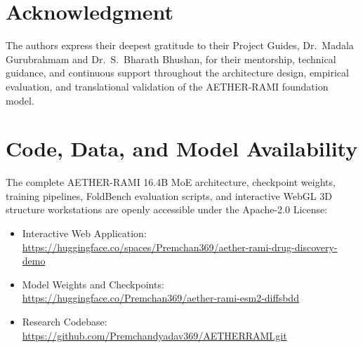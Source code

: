 \documentclass[10pt,journal,compsoc]{IEEEtran}
\begin{document}
\section*{Acknowledgment}
The authors express their deepest gratitude to their Project Guides, Dr.~Madala Gurubrahmam and Dr.~S.~Bharath Bhushan, for their mentorship, technical guidance, and continuous support throughout the architecture design, empirical evaluation, and translational validation of the AETHER-RAMI foundation model.

\section*{Code, Data, and Model Availability}
The complete AETHER-RAMI 16.4B MoE architecture, checkpoint weights, training pipelines, FoldBench evaluation scripts, and interactive WebGL 3D structure workstations are openly accessible under the Apache-2.0 License:
\begin{itemize}
    \item Interactive Web Application: \url{https://huggingface.co/spaces/Premchan369/aether-rami-drug-discovery-demo}
    \item Model Weights and Checkpoints: \url{https://huggingface.co/Premchan369/aether-rami-esm2-diffsbdd}
    \item Research Codebase: \url{https://github.com/Premchandyadav369/AETHERRAMI.git}
\end{itemize}




\end{document}
